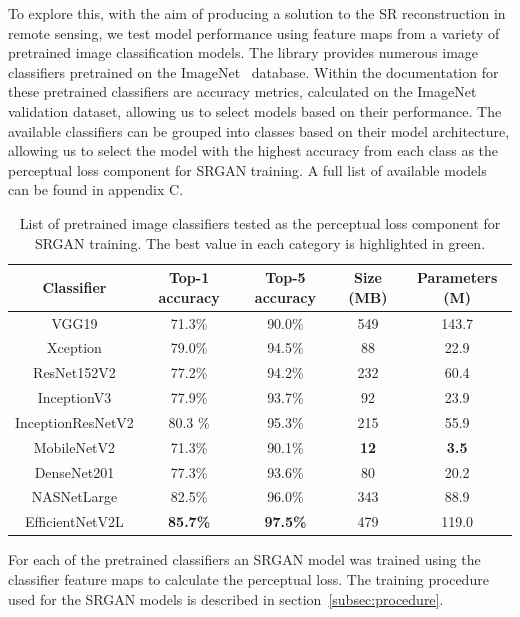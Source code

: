 To explore this, with the aim of producing a solution to the SR reconstruction in remote sensing, we test model performance using feature maps from a variety of pretrained image classification models. The  library provides numerous image classifiers pretrained on the ImageNet~\cite{imageNet} database. Within the documentation for these pretrained classifiers are accuracy metrics, calculated on the ImageNet validation dataset, allowing us to select models based on their performance. The available classifiers can be grouped into classes based on their model architecture, allowing us to select the model with the highest accuracy from each class as the perceptual loss component for SRGAN training. A full list of available models can be found in appendix C.
\begin{table}
    \centering
    \begin{tabular}{ccccc}
        \toprule
        \textbf{Classifier} & \textbf{Top-1 accuracy} & \textbf{Top-5 accuracy} & \textbf{Size (MB)} & \textbf{Parameters (M)} \\
        \midrule
        VGG19 & 71.3\% & 90.0\% & 549 & 143.7 \\
        Xception & 79.0\% & 94.5\% & 88 & 22.9 \\
        ResNet152V2 & 77.2\% & 94.2\% & 232 & 60.4 \\
        InceptionV3 & 77.9\% & 93.7\% & 92 & 23.9 \\
        InceptionResNetV2 & 80.3 \% & 95.3\% & 215 & 55.9 \\
        MobileNetV2 & 71.3\% & 90.1\% & \textbf{12} & \textbf{3.5} \\
        DenseNet201 & 77.3\% & 93.6\% & 80 & 20.2 \\
        NASNetLarge & 82.5\% & 96.0\% & 343 & 88.9 \\
    EfficientNetV2L & \textbf{85.7\%} & \textbf{97.5\%} & 479 & 119.0 \\
        \bottomrule
    \end{tabular}
    \caption{List of pretrained image classifiers tested as the perceptual loss component for SRGAN training. The best value in each category is highlighted in green.}
    \label{table:pretrained_classifiers}
\end{table}

For each of the pretrained classifiers an SRGAN model was trained using the classifier feature maps to calculate the perceptual loss. The training procedure used for the SRGAN models is described in section~\ref{subsec:procedure}.

